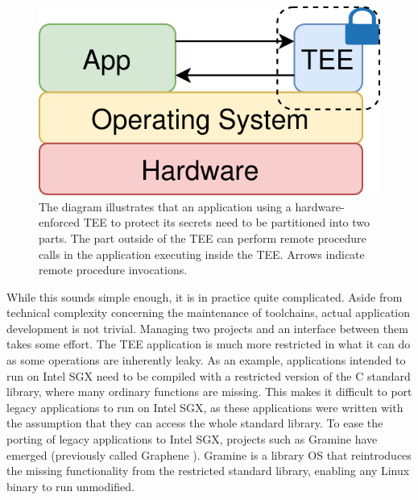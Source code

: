 \begin{figure}
    \centering
    \includegraphics[scale=0.2]{graphics/tee.png}
    \caption{The diagram illustrates that an application using a hardware-enforced TEE to protect its secrets need to
    be partitioned into two parts. The part outside of the TEE can perform remote procedure calls in the application
    executing inside the TEE. Arrows indicate remote procedure invocations.}
    \label{graphics:tee}
\end{figure}

While this sounds simple enough, it is in practice quite complicated. Aside from technical complexity
concerning the maintenance of toolchains, actual application development is not trivial. Managing two projects and an
interface between them takes some effort. The TEE application is much more restricted in what it can do as some
operations are inherently leaky. As an example, applications intended to run on Intel SGX need to be compiled with a
restricted version of the C standard library, where many ordinary functions are missing. This makes it difficult to port
legacy applications to run on Intel SGX, as these applications were written with the assumption that they can access the
whole standard library. To ease the porting of legacy applications to Intel SGX, projects such as Gramine have emerged
(previously called Graphene \cite{DBLP:conf/usenix/TsaiPV17}). Gramine is a library OS that reintroduces the missing
functionality from the restricted standard library, enabling any Linux binary to run unmodified.



